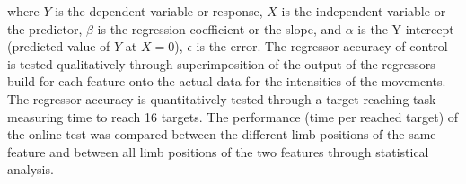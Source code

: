 \documentclass[landscape,a0paper,fontscale=0.375]{baposter} %
\begin{document}
\begin{poster}
{where $Y$ is the dependent variable or response, $X$ is the independent variable or the predictor, $\beta$ is the regression coefficient or the slope, and $\alpha$ is the Y intercept (predicted value of $Y$ at $X = 0$),  $\epsilon$ is the error.
The regressor accuracy of control is tested qualitatively through superimposition of the output of the regressors build for each feature onto the actual data for the intensities of the movements. The regressor accuracy is quantitatively tested through a target reaching task measuring time to reach 16 targets. The performance (time per reached target) of the online test was compared between the different limb positions of the same feature and between all limb positions of the two features through statistical analysis. \vspace{0.5cm}
}


\end{poster}
\end{document}
